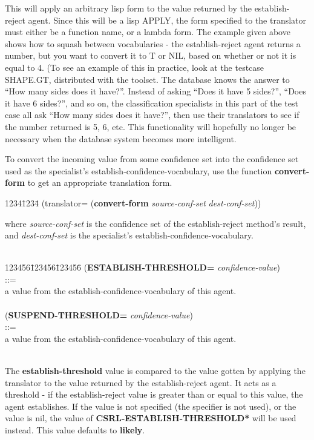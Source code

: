 This will apply an arbitrary lisp form to the value returned by the
establish-reject agent. Since this will be a lisp APPLY, the form
specified to the translator must either be a function name, or a
lambda form. The example given above shows how to squash between
vocabularies - the establish-reject agent returns a number, but you
want to convert it to T or NIL, based on whether or not it is equal to
4. (To see an example of this in practice, look at the testcase
SHAPE.GT, distributed with the toolset. The database knows the answer
to ``How many sides does it have?''. Instead of asking ``Does it have
5 sides?'', ``Does it have 6 sides?'', and so on, the classification
specialists in this part of the test case all ask ``How many sides
does it have?'', then use their translators to see if the number
returned is 5, 6, etc. This functionality will hopefully no longer be
necessary when the database system becomes more intelligent.

To convert the incoming value from some confidence set into the
confidence set used as the specialist's
establish-confidence-vocabulary, use the function {\bf convert-form}
to get an appropriate translation form.

\begin{tabbing}
1234\=1234\= \kill
\>(translator= ({\bf convert-form} {\it source-conf-set\/} {\it
dest-conf-set\/}))\\
\end{tabbing}
where {\it source-conf-set} is the confidence set of the establish-reject
method's result, and {\it dest-conf-set} is the specialist's
establish-confidence-vocabulary. 


\begin{tabbing}
\\
123456\=123456\=123456\= \kill
({\bf ESTABLISH-THRESHOLD=} {\it confidence-value}) \\
\> ::= \\
\>\>\>a value from the establish-confidence-vocabulary of this agent. \\
\\
({\bf SUSPEND-THRESHOLD=} {\it confidence-value}) \\
\> ::= \\
\>\>\>a value from the establish-confidence-vocabulary of this agent.\\
\\
\end{tabbing}
The {\bf establish-threshold} value is compared to the value gotten by
applying the translator to the value returned by the establish-reject
agent. It acts as a threshold - if the establish-reject value is
greater than or equal to this value, the agent establishes. If the
value is not specified (the specifier is not used), or the value is
nil, the value of {\bf *CSRL-ESTABLISH-THRESHOLD*} will be used
instead. This value defaults to {\bf likely}.

